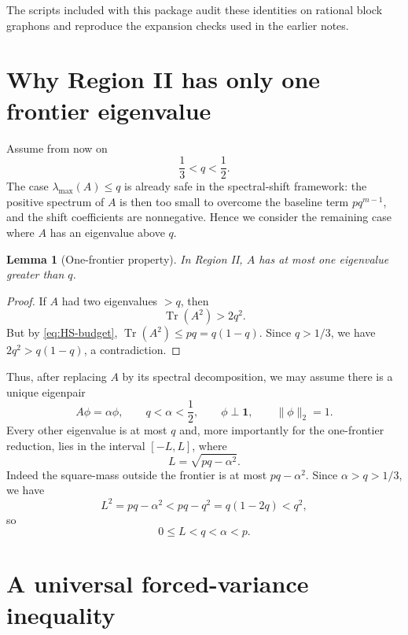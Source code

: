 \documentclass[11pt]{article}
\newtheorem{lemma}[theorem]{Lemma}
\newcommand{\one}{\mathbf 1}
\newcommand{\Tr}{\operatorname{Tr}}
\begin{document}
The scripts included with this package audit these identities on rational
block graphons and reproduce the expansion checks used in the earlier
notes.

\section{Why Region II has only one frontier eigenvalue}

Assume from now on
\[
        \frac13<q<\frac12.
\]
The case $\lambda_{\max}(A)\le q$ is already safe in the spectral-shift
framework: the positive spectrum of $A$ is then too small to overcome the
baseline term $pq^{m-1}$, and the shift coefficients are nonnegative.
Hence we consider the remaining case where $A$ has an eigenvalue above
$q$.

\begin{lemma}[One-frontier property]\label{lem:one-frontier}
In Region II, $A$ has at most one eigenvalue greater than $q$.
\end{lemma}

\begin{proof}
If $A$ had two eigenvalues $>q$, then
\[
        \Tr(A^2)>2q^2.
\]
But by \eqref{eq:HS-budget}, $\Tr(A^2)\le pq=q(1-q)$.  Since
$q>1/3$, we have $2q^2>q(1-q)$, a contradiction.
\end{proof}

Thus, after replacing $A$ by its spectral decomposition, we may assume
there is a unique eigenpair
\begin{equation}\label{eq:frontier-eigenpair}
        A\phi=\alpha\phi,
        \qquad q<\alpha<\frac12,
        \qquad \phi\perp\one,
        \qquad \|\phi\|_2=1.
\end{equation}
Every other eigenvalue is at most $q$ and, more importantly for the
one-frontier reduction, lies in the interval $[-L,L]$, where
\begin{equation}\label{eq:def-L}
        L=\sqrt{pq-\alpha^2}.
\end{equation}
Indeed the square-mass outside the frontier is at most $pq-\alpha^2$.
Since $\alpha>q>1/3$, we have
\[
        L^2=pq-\alpha^2<pq-q^2=q(1-2q)<q^2,
\]
so
\begin{equation}\label{eq:L-order}
        0\le L<q<\alpha<p.
\end{equation}

\section{A universal forced-variance inequality}
\end{document}
